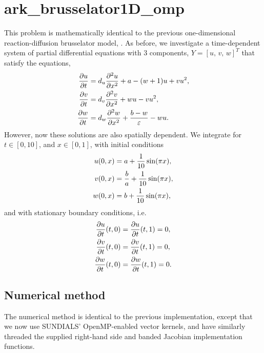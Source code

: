 \documentclass[letterpaper,10pt,english]{sphinxmanual}
\begin{document}
\section{ark\_brusselator1D\_omp}
\label{c_openmp:ark-brusselator1d-omp}\label{c_openmp:id1}
This problem is mathematically identical to the previous
one-dimensional reaction-diffusion brusselator model,
{\hyperref[c_serial:ark-brusselator1d]{\emph{}}}.  As before, we investigate a time-dependent
system of partial differential equations with 3 components, \(Y =
[u,\, v,\, w]^T\) that satisfy the equations,
\begin{gather}
\begin{split}\frac{\partial u}{\partial t} &= d_u \frac{\partial^2 u}{\partial
   x^2} + a - (w+1) u + v u^2, \\
\frac{\partial v}{\partial t} &= d_v \frac{\partial^2 v}{\partial
   x^2} + w u - v u^2, \\
\frac{\partial w}{\partial t} &= d_w \frac{\partial^2 w}{\partial
   x^2} + \frac{b-w}{\varepsilon} - w u.\end{split}\notag
\end{gather}
However, now these solutions are also spatially dependent.  We
integrate for \(t \in [0, 10]\), and \(x \in [0, 1]\), with
initial conditions
\begin{gather}
\begin{split}u(0,x) &=  a + \frac{1}{10} \sin(\pi x),\\
v(0,x) &= \frac{b}{a} + \frac{1}{10}\sin(\pi x),\\
w(0,x) &=  b + \frac{1}{10}\sin(\pi x),\end{split}\notag
\end{gather}
and with stationary boundary conditions, i.e.
\begin{gather}
\begin{split}\frac{\partial u}{\partial t}(t,0) &= \frac{\partial u}{\partial t}(t,1) = 0,\\
\frac{\partial v}{\partial t}(t,0) &= \frac{\partial v}{\partial t}(t,1) = 0,\\
\frac{\partial w}{\partial t}(t,0) &= \frac{\partial w}{\partial t}(t,1) = 0.\end{split}\notag
\end{gather}

\subsection{Numerical method}
\label{c_openmp:numerical-method}
The numerical method is identical to the previous implementation,
except that we now use SUNDIALS' OpenMP-enabled vector kernels, and
have similarly threaded the supplied right-hand side and banded
Jacobian implementation functions.
\end{document}
